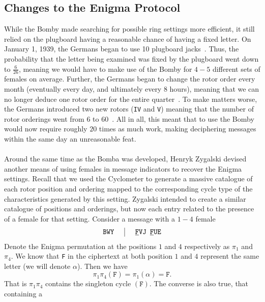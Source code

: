 \subsection{Changes to the Enigma Protocol}
While the Bomby made searching for possible ring settings more
efficient, it still relied on the plugboard having a reasonable
chance of having a fixed letter. On January 1, 1939, the Germans
began to use 10 plugboard jacks~\cite[p.~242]{KozaczukEnigma1984}. Thus, the probability that the letter
being examined was fixed by the plugboard went down to $\frac{6}{26}$,
meaning we would have to make use of the Bomby for $4-5$ different
sets of females on average. Further, the Germans began to change the
rotor order every month (eventually every day, and ultimately
every 8 hours), meaning that we can no longer deduce one rotor order
for the entire quarter~\cite[p.~242]{KozaczukEnigma1984}. To make matters worse, the Germans introduced
two new rotors (\texttt{IV} and \texttt{V}) meaning that the number
of rotor orderings went from $6$ to $60$~\cite[p.~243]{KozaczukEnigma1984}. All in all, this meant that
to use the Bomby would now require roughly $20$ times as much work,
making deciphering messages within the same day an unreasonable feat.
\\\\Around the same time as the Bomba was developed, Henryk Zygalski
devised another means of using females in message indicators to
recover the Enigma settings. Recall that we used the Cyclometer to
generate a massive catalogue of each rotor position and ordering
mapped to the corresponding cycle type of the characteristics generated by
this setting. Zygalski intended to create a similar catalogue of
positions and orderings, but now each entry related to the presence of
a female for that setting. Consider a message with a $1-4$ female
\[
  \setlength{\arraycolsep}{15pt}
  \begin{array}{c | c}
    \texttt{BWY} & {\uline{\texttt{F}}}\texttt{VJ
    }{\uline{\texttt{F}}}\texttt{UE}              \\
  \end{array}
\]
Denote the Enigma permutation at the positions $1$ and $4$
respectively as $\pi_1$ and $\pi_4$. We know that \texttt{F} in
the ciphertext at both position $1$ and $4$ represent the same letter
(we will denote $\alpha$). Then we have
\[
  \pi_1\pi_4(\texttt{F}) = \pi_1(\alpha) = \texttt{F}.
\]
That is $\pi_1\pi_4$ contains the singleton cycle
$(\texttt{F})$. The converse is also true, that containing a
